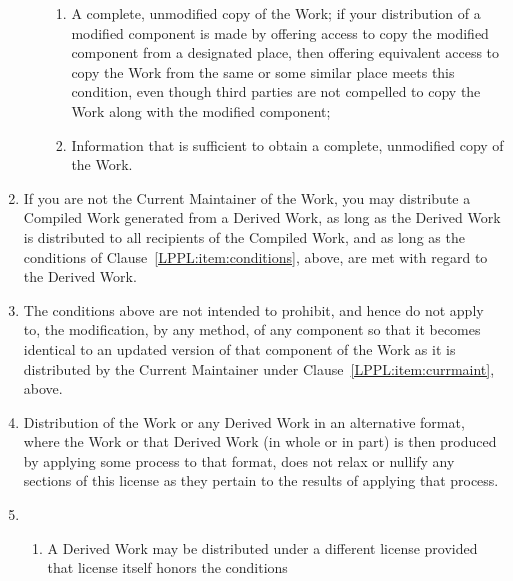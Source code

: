\begin{LPPLicense}
\begin{enumerate}
\begin{enumerate}
                    \begin{enumerate}
                        \item A complete, unmodified copy of the Work; if your
                            distribution of a modified component is made by
                            offering access to copy the modified component from
                            a designated place, then offering equivalent access
                            to copy the Work from the same or some similar
                            place meets this condition, even though third
                            parties are not compelled to copy the Work along
                            with the modified component;
                        \item Information that is sufficient to obtain a
                            complete, unmodified copy of the Work.
                    \end{enumerate}
            \end{enumerate}
        \item If you are not the Current Maintainer of the Work, you may
            distribute a Compiled Work generated from a Derived Work, as long
            as the Derived Work is distributed to all recipients of the
            Compiled Work, and as long as the conditions of
            Clause~\ref{LPPL:item:conditions}, above, are met with regard to
            the Derived Work.
        \item The conditions above are not intended to prohibit, and hence do
            not apply to, the modification, by any method, of any component so
            that it becomes identical to an updated version of that component
            of the Work as it is distributed by the Current Maintainer under
            Clause~\ref{LPPL:item:currmaint}, above.
        \item Distribution of the Work or any Derived Work in an alternative
            format, where the Work or that Derived Work (in whole or in part)
            is then produced by applying some process to that format, does not
            relax or nullify any sections of this license as they pertain to
            the results of applying that process.
        \item \null
            \begin{enumerate}
                \item A Derived Work may be distributed under a different
                    license provided that license itself honors the conditions

\end{enumerate}
\end{enumerate}
\end{LPPLicense}
